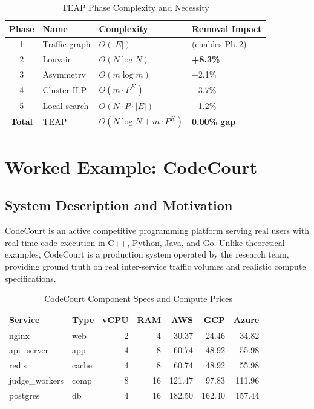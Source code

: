 \documentclass[sigconf,10pt]{acmart}
\begin{document}
\begin{table}[h]
\centering\caption{TEAP Phase Complexity and Necessity}\label{tab:phases}
\footnotesize\setlength{\tabcolsep}{4pt}
\begin{tabular}{clll}
\toprule
Phase & Name & Complexity & Removal Impact\\
\midrule
1 & Traffic graph   & $O(|E|)$           & (enables Ph.\,2)\\
2 & Louvain         & $O(N\log N)$       & \textbf{+8.3\%}\\
3 & Asymmetry       & $O(m\log m)$       & +2.1\%\\
4 & Cluster ILP     & $O(m \cdot P^K)$  & +3.7\%\\
5 & Local search    & $O(N\cdot P\cdot|E|)$ & +1.2\%\\
\midrule
\textbf{Total} & TEAP & $O(N\log N + m\cdot P^K)$ & \textbf{0.00\% gap}\\
\bottomrule
\end{tabular}
\end{table}

\section{Worked Example: CodeCourt}\label{sec:worked}

\subsection{System Description and Motivation}

CodeCourt is an active competitive programming platform serving real users
with real-time code execution in C++, Python, Java, and Go.
Unlike theoretical examples, CodeCourt is a production system operated by the
research team, providing ground truth on real inter-service traffic volumes and
realistic compute specifications.

\begin{table}[h]
\centering\caption{CodeCourt Component Specs and Compute Prices}\label{tab:cc_spec}
\footnotesize\setlength{\tabcolsep}{3pt}
\begin{tabular}{llrrrrrr}
\toprule
Service & Type & vCPU & RAM & AWS & GCP & Azure\\
\midrule
nginx         & web   & 2 & 4  & 30.37 & 24.46 & 34.82\\
api\_server   & app   & 4 & 8  & 60.74 & 48.92 & 55.98\\
redis         & cache & 4 & 8  & 60.74 & 48.92 & 55.98\\
judge\_workers& comp  & 8 & 16 &121.47 & 97.83 &111.96\\
postgres      & db    & 4 & 16 &182.50 &162.40 &157.44\\
\bottomrule
\end{tabular}
\end{table}
\end{document}
